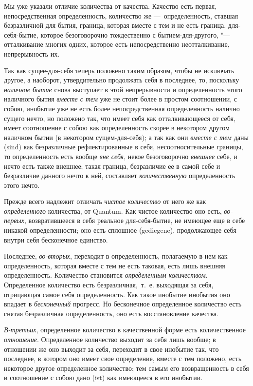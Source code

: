 Мы уже указали отличие количества от качества. Качество есть первая,
непосредственная определенность, количество же —~определенность, ставшая
безразличной для бытия, граница, которая вместе с тем и не есть граница,
для-себя-бытие, которое безоговорочно тождественно с бытием-для-другого,
"--- отталкивание многих одних, которое есть непосредственно
неотталкивание, непрерывность их.

Так как сущее-для-себя теперь положено таким образом, чтобы не исключать
другое, а наоборот, утвердительно продолжать себя в последнее, то,
поскольку {\em наличное бытие} снова выступает в этой
непрерывности и определенность этого наличного бытия
{\em вместе с тем} уже не стоит более в простом
соотношении, с собою, инобытие уже не есть более непосредственная
определенность налично сущего нечто, но положено так, что имеет себя как
отталкивающееся от себя, имеет соотношение с собою как определенность
скорее в некотором другом наличном бытии (в некотором сущем-для-себя); а
так как они {\em вместе с тем} даны
(sind) как безразличные рефлектированные в себя,
несоотносительные границы, то определенность есть вообще
{\em вне себя}, некое безоговорочно
{\em внешнее} себе, и нечто есть также внешнее; такая
граница, безразличие ее в самой себе и безразличие данного нечто к ней,
составляет {\em количественную} определенность этого
нечто.

Прежде всего надлежит отличать {\em чистое количество}
от него же как {\em определенного} количества, от
Quantum. Как чистое количество оно есть,
{\em во-первых}, возвратившееся в себя реальное
для-себя-бытие, не имеющее еще в себе никакой определенности; оно есть
сплошное (gediegene), продолжающее себя внутри
себя бесконечное единство.

Последнее, {\em во-вторых}, переходит в определенность,
полагаемую в нем как определенность, которая вместе с тем не есть таковая,
есть лишь внешняя определенность. Количество становится
{\em определенным количеством}. Определенное количество
есть безразличная,~т.~е. выходящая за себя, отрицающая самое себя
определенность. Как такое инобытие инобытия оно впадает в
{\em бесконечный} прогресс. Но бесконечное определенное
количество есть снятая безразличная определенность, оно есть восстановление
качества.

{\em В-третьих}, определенное количество в качественной
форме есть количественное {\em отношение}. Определенное
количество выходит за себя лишь вообще; в отношении же оно выходит за себя,
переходит в свое инобытие так, что последнее, в котором оно имеет свое
определение, вместе с тем положено, есть некоторое другое определенное
количество; тем самым его возвращенность в себя и соотношение с собою дано
(ist) как имеющееся в его инобытии.

